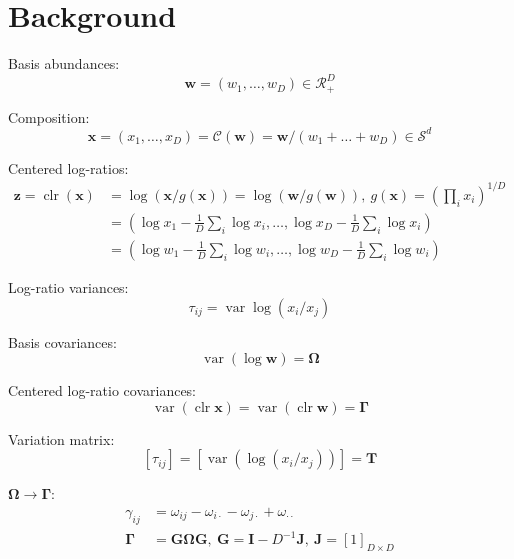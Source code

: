 \documentclass[12pt, letterpaper]{article}
\DeclareMathOperator{\var}{\text{var}}
\DeclareMathOperator{\clr}{\text{clr}}
\begin{document}
\section{Background}

Basis abundances:
\begin{equation}
\bm{w} = (w_1, \dots, w_D) \in \mathscr{R}_+^D
\end{equation}

Composition:
\begin{equation}
\bm{x} = (x_1, \dots, x_D) = \mathscr{C}(\bm{w}) = \bm{w} / (w_1 + \dots + w_D) \in \mathscr{S}^d
\end{equation}

Centered log-ratios:
\begin{align}
\bm{z} = \clr(\bm{x}) &= \log(\bm{x} / g(\bm{x})) = \log(\bm{w} / g(\bm{w})),\ g(\bm{x}) = \left(\prod_i x_i\right)^{1/D} \\
&= \left( \log x_1 - \frac{1}{D} \sum_i \log x_i, \dots, \log x_D - \frac{1}{D} \sum_i \log x_i \right) \\
&= \left( \log w_1 - \frac{1}{D} \sum_i \log w_i, \dots, \log w_D - \frac{1}{D} \sum_i \log w_i \right)
\end{align}

Log-ratio variances:
\begin{equation}
\tau_{ij} = \var \log(x_i / x_j)
\end{equation}

Basis covariances:
\begin{equation}
\var(\log \bm{w}) = \bm{\Omega}
\end{equation}

Centered log-ratio covariances:
\begin{equation}
\var(\clr \bm{x}) = \var(\clr \bm{w}) = \bm{\Gamma}
\end{equation}

Variation matrix:
\begin{equation}
\left[ \tau_{ij} \right] = \left[ \var(\log(x_i / x_j)) \right] = \bm{T}
\end{equation}

$\bm{\Omega} \rightarrow \bm{\Gamma}$:
\begin{align}
\gamma_{ij} &= \omega_{ij} - \omega_{i\cdot} - \omega_{j\cdot} + \omega_{\cdot\cdot} \\
\bm{\Gamma} &= \bm{G} \bm{\Omega} \bm{G},\ \bm{G} = \bm{I} - D^{-1}\bm{J},\ \bm{J} = \left[ 1 \right]_{D \times D}
\end{align}
\end{document}

